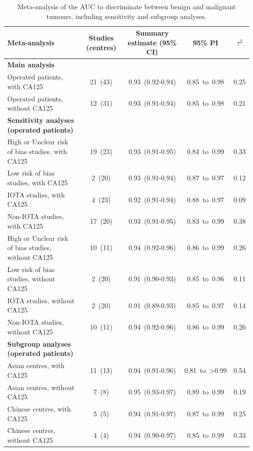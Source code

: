 \begin{table}
\centering
\caption[Meta-analysis of AUC]{Meta-analysis of the AUC to discriminate between benign and malignant tumours, including sensitivity and subgroup analyses.}
\label{tab:2}
\footnotesize
\begin{tabularx}{\textheight}{>{\raggedright\arraybackslash}X c c c c}
\toprule
\textbf{Meta-analysis} & \textbf{Studies (centres)} & \textbf{Summary estimate (95\% \gls{CI})} & \textbf{95\% PI} & \textbf{$\tau^2$} \\
\midrule
\textbf{Main analysis} & & & & \\
Operated patients, with CA125 & 21~(43) & 0.93~(0.92-0.94) & 0.85~to~0.98 & 0.25 \\
Operated patients, without CA125 & 12~(31) & 0.93~(0.91-0.94) & 0.85~to~0.98 & 0.21 \\
\addlinespace
\textbf{Sensitivity analyses (operated patients)} & & & & \\
High or Unclear risk of bias studies, with CA125 & 19~(23) & 0.93~(0.91-0.95) & 0.84~to~0.99 & 0.33 \\
Low risk of bias studies, with CA125 & 2~(20) & 0.93~(0.91-0.94) & 0.87~to~0.97 & 0.12 \\
\gls{IOTA} studies, with CA125 & 4~(23) & 0.92~(0.91-0.94) & 0.88~to~0.97 & 0.09 \\
Non-\gls{IOTA} studies, with CA125 & 17~(20) & 0.93~(0.91-0.95) & 0.83~to~0.99 & 0.38 \\
High or Unclear risk of bias studies, without CA125 & 10~(11) & 0.94~(0.92-0.96) & 0.86~to~0.99 & 0.26 \\
Low risk of bias studies, without CA125 & 2~(20) & 0.91~(0.90-0.93) & 0.85~to~0.96 & 0.11 \\
\gls{IOTA} studies, without CA125 & 2~(20) & 0.91~(0.89-0.93) & 0.85~to~0.97 & 0.14 \\
Non-\gls{IOTA} studies, without CA125 & 10~(11) & 0.94~(0.92-0.96) & 0.86~to~0.99 & 0.26 \\
\addlinespace
\textbf{Subgroup analyses (operated patients)} & & & & \\
Asian centres, with CA125 & 11~(13) & 0.94~(0.91-0.96) & 0.81~to~>0.99 & 0.54 \\
Asian centres, without CA125 & 7~(8) & 0.95~(0.93-0.97) & 0.89~to~0.99 & 0.19 \\
Chinese centres, with CA125 & 5~(5) & 0.94~(0.91-0.97) & 0.87~to~0.99 & 0.25 \\
Chinese centres, without CA125 & 4~(4) & 0.94~(0.90-0.97) & 0.85~to~0.99 & 0.33 \\

\end{tabularx}
\end{table}
